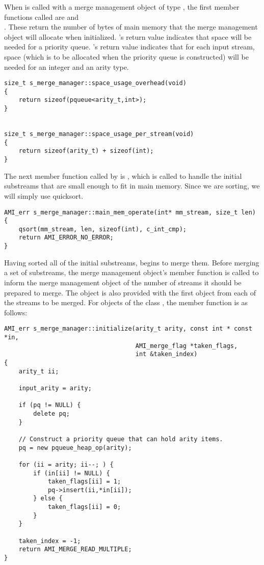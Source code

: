 When  is called with a merge management
object of type , the first member functions called
are  and\\ %
.  These return the number of bytes of main
memory that the merge management object will allocate when initialized.
's return value indicates that space will be
needed for a priority queue.  's return
value indicates that for each input stream, space (which is to be allocated
when the priority queue is constructed) will be needed for an integer and
an arity type.

\begin{verbatim}
size_t s_merge_manager::space_usage_overhead(void)
{
    return sizeof(pqueue<arity_t,int>);
}


size_t s_merge_manager::space_usage_per_stream(void)
{
    return sizeof(arity_t) + sizeof(int);
}
\end{verbatim}

The next member function called by  is
, which is called to handle the initial
substreams that are small enough to fit in main
memory.  Since we are sorting, we will simply use
quicksort.

\begin{verbatim}
AMI_err s_merge_manager::main_mem_operate(int* mm_stream, size_t len)
{
    qsort(mm_stream, len, sizeof(int), c_int_cmp);
    return AMI_ERROR_NO_ERROR;
}
\end{verbatim}

Having sorted all of the initial substreams,
 begins to merge them.  Before merging a
set of substreams, the merge management object's member function
 is called to inform the merge management object of the
number of streams it should be prepared to merge.  The object is also
provided with the first object from each of the streams to be merged.  For
objects of the class , the  member
function is as follows:

\begin{verbatim}
AMI_err s_merge_manager::initialize(arity_t arity, const int * const *in,
                                    AMI_merge_flag *taken_flags,
                                    int &taken_index)
{
    arity_t ii;

    input_arity = arity;

    if (pq != NULL) {
        delete pq;
    }

    // Construct a priority queue that can hold arity items.
    pq = new pqueue_heap_op(arity);

    for (ii = arity; ii--; ) {
        if (in[ii] != NULL) {
            taken_flags[ii] = 1;
            pq->insert(ii,*in[ii]);
        } else {
            taken_flags[ii] = 0;
        }
    }

    taken_index = -1;
    return AMI_MERGE_READ_MULTIPLE;
}
\end{verbatim}

